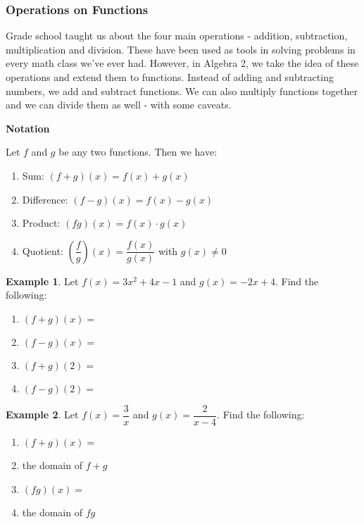 \documentclass[addpoints,12pt]{exam}
\theoremstyle{definition}
\newtheorem{example}{Example}[subsection]
\begin{document}
\subsubsection*{Operations on Functions}
Grade school taught us about the four main operations - addition, subtraction, multiplication and division. These have been used as tools in solving problems in every math class we've ever had. However, in Algebra 2, we take the idea of these operations and extend them to functions. Instead of adding and subtracting numbers, we add and subtract functions. We can also multiply functions together and we can divide them as well - with some caveats.

\begin{mdframed}
\textbf{Notation}

Let $f$ and $g$ be any two functions. Then we have:
\begin{enumerate}
\item Sum: $(f+g)(x) = f(x)+g(x)$
\vspace{.15in}
\item Difference: $(f-g)(x) = f(x)-g(x)$
\vspace{.15in}
\item Product: $(fg)(x) = f(x)\cdot g(x)$
\vspace{.15in}
\item Quotient: $\left(\dfrac{f}{g}\right)(x) = \dfrac{f(x)}{g(x)}$ with $g(x)\neq 0$
\vspace{.15in}
\end{enumerate}
\end{mdframed}

\newpage

\begin{example}
Let $f(x) = 3x^2+4x-1$ and $g(x) = -2x+4$. Find the following:
\begin{enumerate}
\item $(f+g)(x) = $
\vspace{.7in}
\item $(f-g)(x) = $
\vspace{.7in}
\item $(f+g)(2) = $
\vspace{.5in}
\item $(f-g)(2) = $
\vspace{.5in}
\end{enumerate}
\end{example}


\begin{example}
Let $f(x) = \dfrac{3}{x}$ and $g(x) = \dfrac{2}{x-4}$. Find the following:
\begin{enumerate}
\item $(f+g)(x) = $
\vspace{.7in}
\item the domain of $f+g$
\vspace{.7in}
\item $(fg)(x) = $
\vspace{.7in}
\item the domain of $fg$
\end{enumerate}
\end{example}
\end{document}
